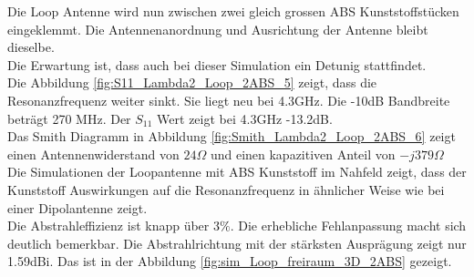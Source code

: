Die Loop Antenne wird nun zwischen zwei gleich grossen ABS Kunststoffstücken eingeklemmt. Die Antennenanordnung und Ausrichtung der Antenne bleibt dieselbe. \\
Die Erwartung ist, dass auch bei dieser Simulation ein Detunig stattfindet.\\ 

Die Abbildung \ref{fig:S11_Lambda2_Loop_2ABS_5} zeigt, dass die Resonanzfrequenz weiter sinkt. Sie liegt neu bei 4.3GHz. Die -10dB Bandbreite beträgt 270 MHz. Der $S_{11}$ Wert zeigt bei 4.3GHz -13.2dB.\\
Das Smith Diagramm in Abbildung \ref{fig:Smith_Lambda2_Loop_2ABS_6} zeigt einen Antennenwiderstand von $24\Omega$ und einen kapazitiven Anteil von $-j379\Omega$\\
Die Simulationen der Loopantenne mit ABS Kunststoff im Nahfeld  zeigt, dass der Kunststoff  Auswirkungen auf die Resonanzfrequenz in ähnlicher Weise wie bei einer Dipolantenne zeigt.\\
Die Abstrahleffizienz ist knapp über $3\%$. Die erhebliche Fehlanpassung macht sich deutlich bemerkbar. Die Abstrahlrichtung mit der stärksten Ausprägung zeigt nur 1.59dBi. Das ist in der Abbildung \ref{fig:sim_Loop_freiraum_3D_2ABS} gezeigt.
